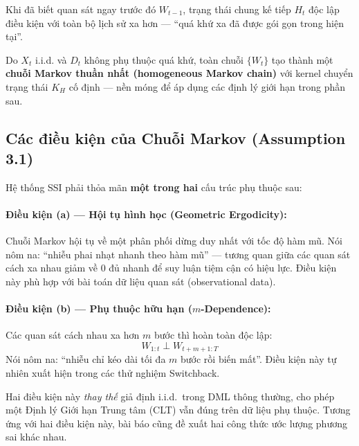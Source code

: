 Khi đã biết quan sát ngay trước đó \(W_{t-1}\), trạng thái chung kế tiếp \(H_t\) độc lập điều kiện với toàn bộ lịch sử xa hơn --- ``quá khứ xa đã được gói gọn trong hiện tại''.

Do \(X_t\) i.i.d. và \(D_t\) không phụ thuộc quá khứ, toàn chuỗi \(\{W_t\}\) tạo thành một \textbf{chuỗi Markov thuần nhất (homogeneous Markov chain)} với kernel chuyển trạng thái \(K_H\) cố định --- nền móng để áp dụng các định lý giới hạn trong phần sau.

\subsection{Các điều kiện của Chuỗi Markov (Assumption 3.1)}

Hệ thống SSI phải thỏa mãn \textbf{một trong hai} cấu trúc phụ thuộc sau:

\paragraph{Điều kiện (a) --- Hội tụ hình học (Geometric Ergodicity):}
Chuỗi Markov hội tụ về một phân phối dừng duy nhất với tốc độ hàm mũ. Nói nôm na: ``nhiễu phai nhạt nhanh theo hàm mũ'' --- tương quan giữa các quan sát cách xa nhau giảm về 0 đủ nhanh để suy luận tiệm cận có hiệu lực. Điều kiện này phù hợp với bài toán dữ liệu quan sát (observational data).

\paragraph{Điều kiện (b) --- Phụ thuộc hữu hạn (\(m\)-Dependence):}
Các quan sát cách nhau xa hơn \(m\) bước thì hoàn toàn độc lập:
\[
    W_{1:t} \perp W_{t+m+1:T}
\]
Nói nôm na: ``nhiễu chỉ kéo dài tối đa \(m\) bước rồi biến mất''. Điều kiện này tự nhiên xuất hiện trong các thử nghiệm Switchback.

Hai điều kiện này \textit{thay thế} giả định i.i.d.\ trong DML thông thường, cho phép một Định lý Giới hạn Trung tâm (CLT) vẫn đúng trên dữ liệu phụ thuộc. Tương ứng với hai điều kiện này, bài báo cũng đề xuất hai công thức ước lượng phương sai khác nhau.
